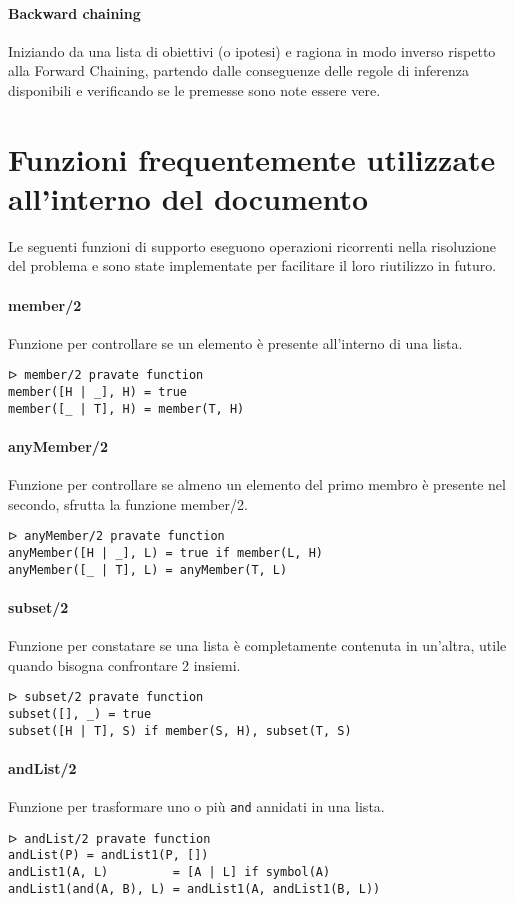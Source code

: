 \documentclass[12pt,twoside]{report}
\begin{document}
\paragraph{Backward chaining} Iniziando da una lista di obiettivi (o ipotesi) e ragiona in modo inverso rispetto alla Forward Chaining, partendo dalle conseguenze delle regole di inferenza disponibili e verificando se le premesse sono note essere vere.

\section*{Funzioni frequentemente utilizzate all'interno del documento}

Le seguenti funzioni di supporto eseguono operazioni ricorrenti nella risoluzione del problema e sono state implementate per facilitare il loro riutilizzo in futuro.
\paragraph{member/2}
Funzione per controllare se un elemento è presente all'interno di una lista.
\begin{lstlisting}
ᐅ member/2 pravate function 
member([H | _], H) = true
member([_ | T], H) = member(T, H)
\end{lstlisting}

\paragraph{anyMember/2}
Funzione per controllare se almeno un elemento del primo membro è presente nel secondo, sfrutta la funzione member/2.
\begin{lstlisting}
ᐅ anyMember/2 pravate function
anyMember([H | _], L) = true if member(L, H)
anyMember([_ | T], L) = anyMember(T, L)
\end{lstlisting}

\paragraph{subset/2}
Funzione per constatare se una lista è completamente contenuta in un'altra, utile quando bisogna confrontare 2 insiemi.
\begin{lstlisting}
ᐅ subset/2 pravate function
subset([], _) = true
subset([H | T], S) if member(S, H), subset(T, S)
\end{lstlisting}

\paragraph{andList/2}
Funzione per trasformare uno o più \texttt{and} annidati in una lista.
\begin{lstlisting}
ᐅ andList/2 pravate function
andList(P) = andList1(P, [])
andList1(A, L)         = [A | L] if symbol(A)
andList1(and(A, B), L) = andList1(A, andList1(B, L))
\end{lstlisting}
\end{document}
